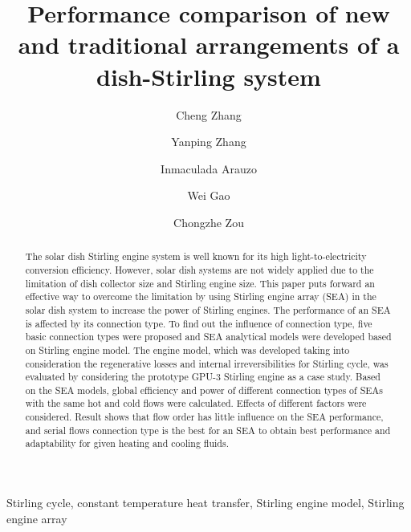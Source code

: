 \documentclass[preprint,5p, twocolumn]{elsarticle}
\begin{document}
\begin{frontmatter}
\title{Performance comparison of new and traditional arrangements of a dish-Stirling system}
\date{}
\author[label1]{Cheng Zhang}
\author[label1]{Yanping Zhang}
\author[label2]{Inmaculada Arauzo}
\author[label1]{Wei Gao}
\author[label1]{Chongzhe Zou}


\address[label1]{School of Energy and Power Engineering, Huazhong University of Science and Technology, Wuhan, China}
\address[label2]{CIRCE Research Institute, University of Zaragoza, Maria de Luna, Zaragoza, Spain}

\begin{abstract}
The solar dish Stirling engine system is well known for its high light-to-electricity conversion efficiency. However, solar dish systems are not widely applied due to the limitation of dish collector size and Stirling engine size. This paper puts forward an effective way to overcome the limitation by using Stirling engine array (SEA) in the solar dish system to increase the power of Stirling engines. The performance of an SEA is affected by its connection type. To find out the influence of connection type, five basic connection types were proposed and SEA analytical models were developed based on Stirling engine model. The engine model, which was developed taking into consideration the regenerative losses and internal irreversibilities for Stirling cycle, was evaluated by considering the prototype GPU-3 Stirling engine as a case study. Based on the SEA models, global efficiency and power of different connection types of SEAs with the same hot and cold flows were calculated. Effects of different factors were considered. Result shows that flow order has little influence on the SEA performance, and serial flows connection type is the best for an SEA to obtain best performance and adaptability for given heating and cooling fluids.
\end{abstract}

\begin{keyword}Stirling cycle, constant temperature heat transfer, Stirling engine model, Stirling engine array
\end{keyword}

\end{frontmatter}
\end{document}
